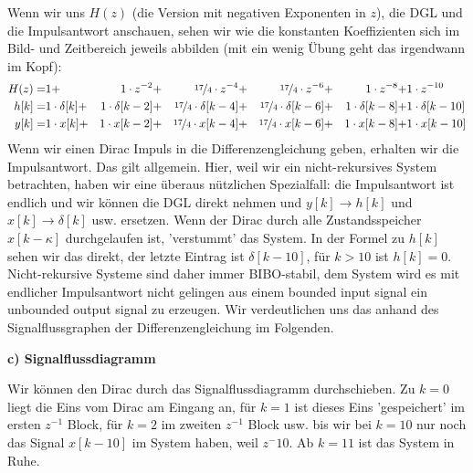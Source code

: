 \begin{ExCalc}
\begin{center}
\end{center}
%
Wenn wir uns $H(z)$ (die Version mit negativen Exponenten in $z$), die DGL und
die Impulsantwort anschauen, sehen wir wie die konstanten Koeffizienten
sich im Bild- und Zeitbereich jeweils abbilden (mit ein wenig Übung geht das
irgendwann im Kopf):
\begin{align}
H(z) =& 1 +& 1 \cdot z^{-2} +&& \nicefrac{17}{4} \cdot z^{-4}  +&& \nicefrac{17}{4} \cdot z^{-6} +&& 1 \cdot z^{-8} +& 1 \cdot z^{-10}\nonumber\\
h[k] =& 1 \cdot \delta[k] +& 1 \cdot \delta[k-2] +&& \nicefrac{17}{4} \cdot \delta[k-4] +&& \nicefrac{17}{4} \cdot \delta[k-6] +&& 1 \cdot \delta[k-8] +& 1 \cdot \delta[k-10]\nonumber\\
y[k] =& 1\cdot x[k] +& 1\cdot x[k-2] +&& \nicefrac{17}{4}\cdot x[k-4] +&& \nicefrac{17}{4}\cdot x[k-6] +&& 1\cdot x[k-8] +& 1\cdot x[k-10]
\end{align}
Wenn wir einen Dirac Impuls in die Differenzengleichung geben, erhalten wir
die Impulsantwort. Das gilt allgemein. Hier, weil wir ein nicht-rekursives
System betrachten, haben wir eine überaus nützlichen Spezialfall:
die Impulsantwort ist endlich und wir können die
DGL direkt nehmen und $y[k]\rightarrow h[k]$ und $x[k]\rightarrow \delta[k]$ usw.
ersetzen. Wenn der Dirac durch alle Zustandsspeicher
$x[k-\kappa]$ durchgelaufen ist, 'verstummt' das System.
%
In der Formel zu $h[k]$ sehen wir das direkt, der letzte Eintrag ist $\delta[k-10]$,
für $k>10$ ist $h[k]=0$.
%
Nicht-rekursive Systeme sind daher immer BIBO-stabil, dem System wird es mit
endlicher Impulsantwort nicht gelingen aus einem bounded input signal ein
unbounded output signal zu erzeugen.
%
Wir verdeutlichen uns das anhand
des Signalflussgraphen der Differenzengleichung im Folgenden.
%

\textbf{c) Signalflussdiagramm}

Wir können den Dirac durch das Signalflussdiagramm durchschieben.
Zu $k=0$ liegt die Eins vom Dirac am Eingang an, für $k=1$ ist dieses Eins
'gespeichert' im ersten $z^{-1}$ Block, für $k=2$ im zweiten $z^{-1}$ Block
usw. bis wir bei $k=10$ nur noch das Signal $x[k-10]$ im System haben, weil
$z^-10$. Ab $k=11$ ist das System in Ruhe.


\end{ExCalc}
